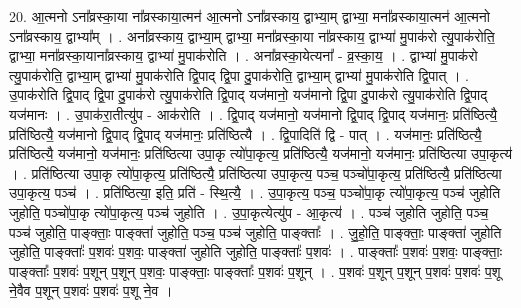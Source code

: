 \documentclass[17pt]{extarticle}
\begin{document}
20. आ॒त्मनो ऽना᳚व्रस्का॒या ना᳚व्रस्काया॒त्मन॑ आ॒त्मनो ऽना᳚व्रस्काय॒ द्वाभ्या॒म् द्वाभ्या॒ मना᳚व्रस्काया॒त्मन॑ आ॒त्मनो ऽना᳚व्रस्काय॒ द्वाभ्या᳚म् । . अना᳚व्रस्काय॒ द्वाभ्या॒म् द्वाभ्या॒ मना᳚व्रस्का॒या ना᳚व्रस्काय॒ द्वाभ्या॑ मु॒पाक॑रो त्यु॒पाक॑रोति॒ द्वाभ्या॒ मना᳚व्रस्का॒याना᳚व्रस्काय॒ द्वाभ्या॑ मु॒पाक॑रोति । . अना᳚व्रस्का॒येत्यना᳚ - व्र॒स्का॒य॒ । . द्वाभ्या॑ मु॒पाक॑रो त्यु॒पाक॑रोति॒ द्वाभ्या॒म् द्वाभ्या॑ मु॒पाक॑रोति द्वि॒पाद् द्वि॒पा दु॒पाक॑रोति॒ द्वाभ्या॒म् द्वाभ्या॑ मु॒पाक॑रोति द्वि॒पात् । . उ॒पाक॑रोति द्वि॒पाद् द्वि॒पा दु॒पाक॑रो त्यु॒पाक॑रोति द्वि॒पाद् यज॑मानो॒ यज॑मानो द्वि॒पा दु॒पाक॑रो त्यु॒पाक॑रोति द्वि॒पाद् यज॑मानः । . उ॒पाक॑रा॒तीत्यु॑प - आक॑रोति । . द्वि॒पाद् यज॑मानो॒ यज॑मानो द्वि॒पाद् द्वि॒पाद् यज॑मानः॒ प्रति॑ष्ठित्यै॒ प्रति॑ष्ठित्यै॒ यज॑मानो द्वि॒पाद् द्वि॒पाद् यज॑मानः॒ प्रति॑ष्ठित्यै । . द्वि॒पादिति॑ द्वि - पात् । . यज॑मानः॒ प्रति॑ष्ठित्यै॒ प्रति॑ष्ठित्यै॒ यज॑मानो॒ यज॑मानः॒ प्रति॑ष्ठित्या उपा॒कृ त्यो॑पा॒कृत्य॒ प्रति॑ष्ठित्यै॒ यज॑मानो॒ यज॑मानः॒ प्रति॑ष्ठित्या उपा॒कृत्य॑ । . प्रति॑ष्ठित्या उपा॒कृ त्यो॑पा॒कृत्य॒ प्रति॑ष्ठित्यै॒ प्रति॑ष्ठित्या उपा॒कृत्य॒ पञ्च॒ पञ्चो॑पा॒कृत्य॒ प्रति॑ष्ठित्यै॒ प्रति॑ष्ठित्या उपा॒कृत्य॒ पञ्च॑ । . प्रति॑ष्ठित्या॒ इति॒ प्रति॑ - स्थि॒त्यै॒ । . उ॒पा॒कृत्य॒ पञ्च॒ पञ्चो॑पा॒कृ त्यो॑पा॒कृत्य॒ पञ्च॑ जुहोति जुहोति॒ पञ्चो॑पा॒कृ त्यो॑पा॒कृत्य॒ पञ्च॑ जुहोति । . उ॒पा॒कृत्येत्यु॑प - आ॒कृत्य॑ । . पञ्च॑ जुहोति जुहोति॒ पञ्च॒ पञ्च॑ जुहोति॒ पाङ्क्ताः॒ पाङ्क्ता॑ जुहोति॒ पञ्च॒ पञ्च॑ जुहोति॒ पाङ्क्ताः᳚ । . जु॒हो॒ति॒ पाङ्क्ताः॒ पाङ्क्ता॑ जुहोति जुहोति॒ पाङ्क्ताः᳚ प॒शवः॑ प॒शवः॒ पाङ्क्ता॑ जुहोति जुहोति॒ पाङ्क्ताः᳚ प॒शवः॑ । . पाङ्क्ताः᳚ प॒शवः॑ प॒शवः॒ पाङ्क्ताः॒ पाङ्क्ताः᳚ प॒शवः॑ प॒शून् प॒शून् प॒शवः॒ पाङ्क्ताः॒ पाङ्क्ताः᳚ प॒शवः॑ प॒शून् । . प॒शवः॑ प॒शून् प॒शून् प॒शवः॑ प॒शवः॑ प॒शू ने॒वैव प॒शून् प॒शवः॑ प॒शवः॑ प॒शू ने॒व । \newline
\end{document}
